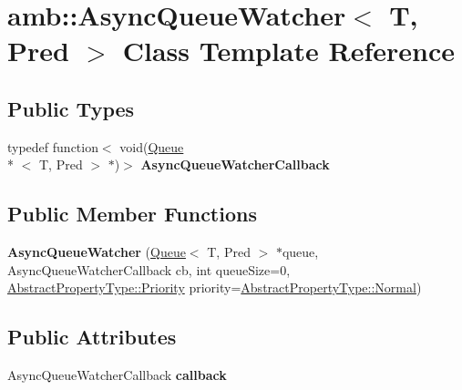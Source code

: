 \hypertarget{classamb_1_1AsyncQueueWatcher}{\section{amb\-:\-:Async\-Queue\-Watcher$<$ T, Pred $>$ Class Template Reference}
\label{classamb_1_1AsyncQueueWatcher}
}
\subsection*{Public Types}
\begin{DoxyCompactItemize}
\item 
\hypertarget{classamb_1_1AsyncQueueWatcher_a6516f6046d2da8f05b0b8e995c9d266d}{typedef function$<$ void(\hyperlink{classamb_1_1Queue}{Queue}\\*
$<$ T, Pred $>$ $\ast$)$>$ {\bfseries Async\-Queue\-Watcher\-Callback}}\label{classamb_1_1AsyncQueueWatcher_a6516f6046d2da8f05b0b8e995c9d266d}

\end{DoxyCompactItemize}
\subsection*{Public Member Functions}
\begin{DoxyCompactItemize}
\item 
\hypertarget{classamb_1_1AsyncQueueWatcher_a81e2e8e45fe104c1368a7ef250ce7469}{{\bfseries Async\-Queue\-Watcher} (\hyperlink{classamb_1_1Queue}{Queue}$<$ T, Pred $>$ $\ast$queue, Async\-Queue\-Watcher\-Callback cb, int queue\-Size=0, \hyperlink{classAbstractPropertyType_a1e513f66eb2dd2bd2cddbec16422af63}{Abstract\-Property\-Type\-::\-Priority} priority=\hyperlink{classAbstractPropertyType_a1e513f66eb2dd2bd2cddbec16422af63a3412bc77a6a781fb4a832059f1fe5d9a}{Abstract\-Property\-Type\-::\-Normal})}\label{classamb_1_1AsyncQueueWatcher_a81e2e8e45fe104c1368a7ef250ce7469}

\end{DoxyCompactItemize}
\subsection*{Public Attributes}
\begin{DoxyCompactItemize}
\item 
\hypertarget{classamb_1_1AsyncQueueWatcher_a0112d0e35911204b96256e913a065bdb}{Async\-Queue\-Watcher\-Callback {\bfseries callback}}\label{classamb_1_1AsyncQueueWatcher_a0112d0e35911204b96256e913a065bdb}

\end{DoxyCompactItemize}
